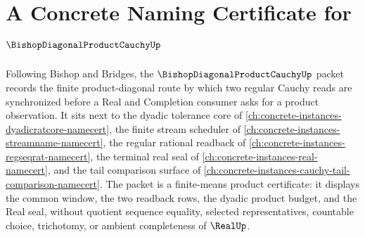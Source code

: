 \chapter{A Concrete Naming Certificate for $\BishopDiagonalProductCauchyUp$}
\label{ch:concrete-instances-bishop-diagonal-product-cauchy-namecert}

Following Bishop and Bridges, the $\BishopDiagonalProductCauchyUp$ packet records the finite product-diagonal route by which two regular Cauchy reads are synchronized before a Real and Completion consumer asks for a product observation. It sits next to the dyadic tolerance core of \autoref{ch:concrete-instances-dyadicratcore-namecert}, the finite stream scheduler of \autoref{ch:concrete-instances-streamname-namecert}, the regular rational readback of \autoref{ch:concrete-instances-regseqrat-namecert}, the terminal real seal of \autoref{ch:concrete-instances-real-namecert}, and the tail comparison surface of \autoref{ch:concrete-instances-cauchy-tail-comparison-namecert}. The packet is a finite-means product certificate: it displays the common window, the two readback rows, the dyadic product budget, and the Real seal, without quotient sequence equality, selected representatives, countable choice, trichotomy, or ambient completeness of $\RealUp$.

